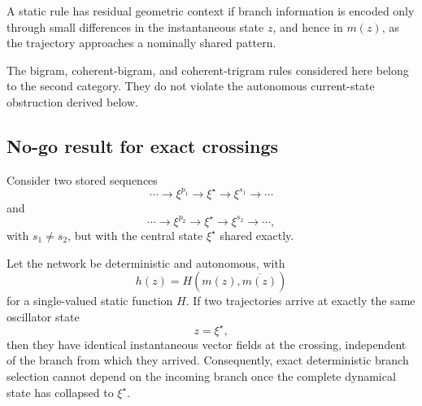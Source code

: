 \begin{definition}
A static rule has residual geometric context if branch information is encoded
only through small differences in the instantaneous state $z$, and hence in
$m(z)$, as the trajectory approaches a nominally shared pattern.
\end{definition}

The bigram, coherent-bigram, and coherent-trigram rules considered here belong
to the second category.  They do not violate the autonomous current-state
obstruction derived below.

\subsection{No-go result for exact crossings}

Consider two stored sequences
\begin{equation}
\cdots
\rightarrow \xi^{p_1}
\rightarrow \xi^\star
\rightarrow \xi^{s_1}
\rightarrow\cdots
\end{equation}
and
\begin{equation}
\cdots
\rightarrow \xi^{p_2}
\rightarrow \xi^\star
\rightarrow \xi^{s_2}
\rightarrow\cdots,
\end{equation}
with $s_1\neq s_2$, but with the central state $\xi^\star$ shared exactly.

\begin{proposition}
\label{prop:no-go}
Let the network be deterministic and autonomous, with
\begin{equation}
h(z)=H(m(z),\overline{m(z)})
\end{equation}
for a single-valued static function $H$.  If two trajectories arrive at exactly
the same oscillator state
\begin{equation}
z=\xi^\star,
\end{equation}
then they have identical instantaneous vector fields at the crossing,
independent of the branch from which they arrived.
Consequently, exact deterministic branch selection cannot depend on the
incoming branch once the complete dynamical state has collapsed to
$\xi^\star$.
\end{proposition}

